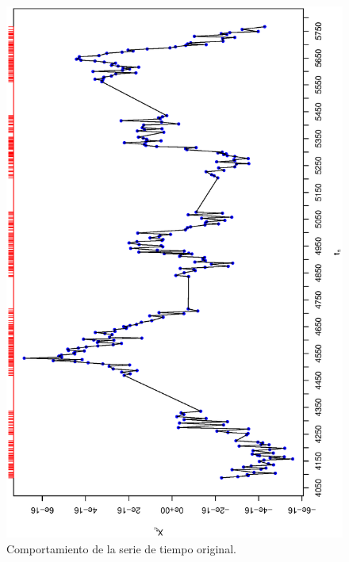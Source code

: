 \begin{figure}[h]
    \begin{minipage}{0.45\textwidth}
    \includegraphics[width=0.8\linewidth,angle = 270]{Kap3/Fig_Cap3/agn_data.eps}
    \caption{Comportamiento de la serie de tiempo original.}
    \label{fig:example_agn}
    \end{minipage}
    \hfill
    \begin{minipage}{0.45\textwidth}

\end{minipage}
\end{figure}
